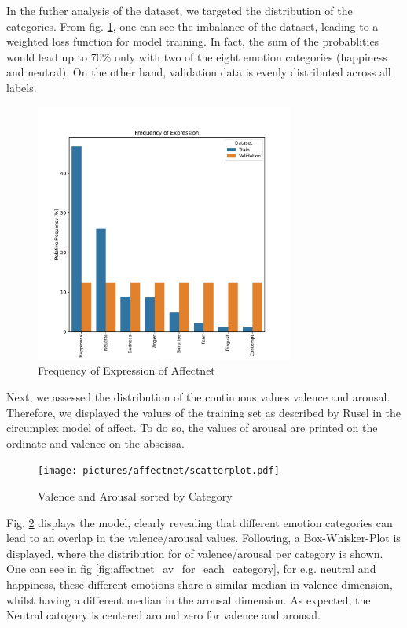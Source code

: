 \documentclass[conference]{IEEEtran}
\begin{document}
In the futher analysis of the dataset, we targeted the distribution of the categories. From fig. \ref{frequenceAffectNet}, one can see the imbalance of the dataset, leading to a weighted loss function for model training. In fact, the sum of the probablities would lead up to 70\% only with two of the eight emotion categories (happiness and neutral). On the other hand, validation data is evenly distributed across all labels.

%
\begin{figure}[ht]
    \centering
    \includegraphics[width=8.5cm]{pictures/affectnet/frequency_of_expression.pdf}
    \caption{Frequency of Expression of Affectnet}
    \label{frequenceAffectNet}
\end{figure}

Next, we assessed the distribution of the continuous values valence and arousal. Therefore, we displayed the values of the training set as described by Rusel \cite{rusellmodell} in the circumplex model of affect. To do so, the values of arousal are printed on the ordinate and valence on the abscissa. 

\begin{figure}[ht]
    \centering
    \texttt{[image: pictures/affectnet/scatterplot.pdf]}
    \caption{Valence and Arousal sorted by Category}
    \label{fig:scatterplot}
\end{figure}

Fig. \ref{fig:scatterplot} displays the model, clearly revealing that different emotion categories can lead to an overlap in the valence/arousal values. Following, a Box-Whisker-Plot is displayed, where the distribution for of valence/arousal per category is shown. One can see in fig \ref{fig:affectnet_av_for_each_category}, for e.g. neutral and happiness, these different emotions share a similar median in valence dimension, whilst having a different median in the arousal dimension. As expected, the Neutral catogory is centered around zero for valence and arousal. 
\end{document}
